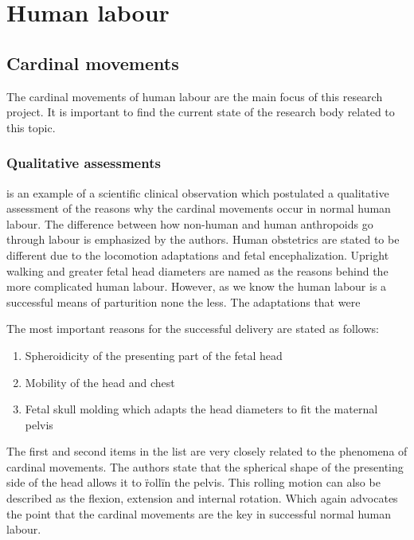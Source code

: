 \section{Human labour}

\subsection{Cardinal movements}

  The cardinal movements of human labour are the main focus of this research project. It is important to find the current state of the research body related to this topic.

  \subsubsection{Qualitative assessments}

  \citet{abitbol1993} is an example of a scientific clinical observation which postulated a qualitative assessment of the reasons why the cardinal movements occur in normal human labour. The difference between how non-human and human anthropoids go through labour is emphasized by the authors. Human obstetrics are stated to be different due to the locomotion adaptations and fetal encephalization. Upright walking and greater fetal head diameters are named as the reasons behind the more complicated human labour. However, as we know the human labour is a successful means of parturition none the less. The adaptations that were

  The most important reasons for the successful delivery are stated as follows:

  \begin{enumerate}

    \item Spheroidicity of the presenting part of the fetal head
    \item Mobility of the head and chest
    \item Fetal skull molding which adapts the head diameters to fit the maternal pelvis

  \end{enumerate}

  The first and second items in the list are very closely related to the phenomena of cardinal movements. The authors state that the spherical shape of the presenting side of the head allows it to \"roll\" in the pelvis. This rolling motion can also be described as the flexion, extension and internal rotation. Which again advocates the point that the cardinal movements are the key in successful normal human labour.


